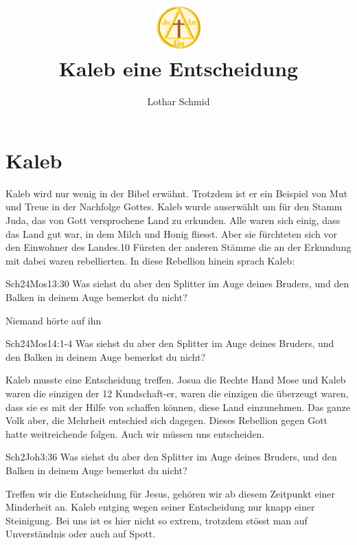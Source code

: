 \documentclass[12pt,a4paper]{scrarticle}
\title{\includegraphics[height=48pt]{assets/images/logo.png}\\Kaleb eine Entscheidung}
\author{Lothar Schmid}
\begin{document}
\maketitle
\section{Kaleb}
Kaleb wird nur wenig in der Bibel erwähnt. Trotzdem ist er ein Beispiel von Mut und Treue in der Nachfolge Gottes. Kaleb wurde auserwählt um für den Stamm Juda, das von Gott versprochene Land zu erkunden. Alle waren sich einig, dass das Land gut war, in dem Milch und Honig fliesst. Aber sie fürchteten sich vor den Einwohner des Landes.10 Fürsten der anderen Stämme die an der Erkundung mit dabei waren rebellierten. In diese Rebellion hinein sprach Kaleb:
\begin{bibeltext}{Sch2}{4Mos}{13:30}
    Was siehst du aber den Splitter im Auge deines Bruders, und den Balken in deinem
Auge bemerkst du nicht?
\end{bibeltext}
Niemand hörte auf ihn
\begin{bibeltext}{Sch2}{4Mos}{14:1-4}
    Was siehst du aber den Splitter im Auge deines Bruders, und den Balken in deinem
Auge bemerkst du nicht?
\end{bibeltext}
Kaleb musste eine Entscheidung treffen. Josua die Rechte Hand Mose und Kaleb waren die einzigen der 12 Kundschaft-er, waren die einzigen die überzeugt waren, dass sie es mit der Hilfe von schaffen können, diese Land einzunehmen. Das ganze Volk aber, die Mehrheit entschied sich dagegen. Dieses Rebellion gegen Gott hatte weitreichende folgen.
Auch wir müssen uns entscheiden. 
\begin{bibeltext}{Sch2}{Joh}{3:36}
    Was siehst du aber den Splitter im Auge deines Bruders, und den Balken in deinem
Auge bemerkst du nicht?
\end{bibeltext}
Treffen wir die Entscheidung für Jesus, gehören wir ab diesem Zeitpunkt einer Minderheit an. Kaleb entging wegen seiner Entscheidung nur knapp einer Steinigung. Bei uns ist es hier nicht so extrem, trotzdem stösst man auf Unverständnis oder auch auf Spott.
\end{document}
